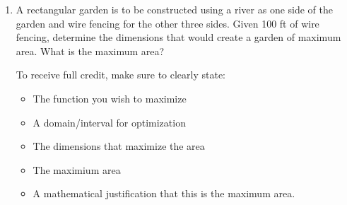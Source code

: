 \documentclass[11pt]{article}
\begin{document}
\begin{enumerate}
\newpage


\item A rectangular garden is to be constructed using a river as one side of the garden and wire fencing for the other three sides. Given 100 ft of wire fencing, determine the dimensions that would create a garden of maximum area. What is the maximum area?
\vspace{0.5cm}





To receive full credit, make sure to clearly state:

\begin{itemize}
    \item The function you wish to maximize\\
    \item A domain/interval for optimization\\
    \item The dimensions that maximize the area\\
    \item The maximium area\\
    \item A mathematical justification that this is the maximum area.
\end{itemize}



\end{enumerate}
\end{document}
